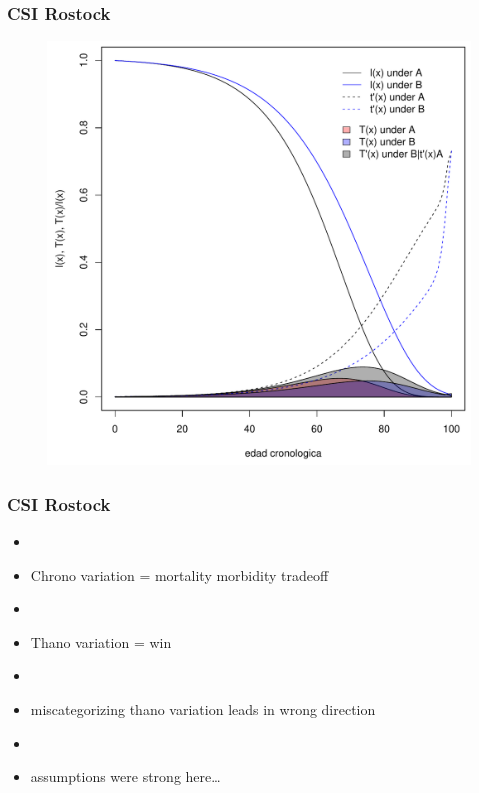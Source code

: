 \documentclass[20pt]{beamer}
\begin{document}
\begin{frame}
\frametitle{CSI Rostock}
\begin{figure}[b]
    \centering
    \includegraphics[scale=.9]{Figures/LabPres/Z6TxATxB.pdf}
\end{figure} 
\end{frame}

\begin{frame}
\frametitle{CSI Rostock}
\begin{itemize}
  \item\item<1-> Chrono variation = mortality morbidity tradeoff
  \item\item<2-> Thano variation = win
  \item\item<3-> miscategorizing thano variation leads in wrong direction
  \item\item<4-> assumptions were strong here\ldots
\end{itemize}
\end{frame}
\end{document}
